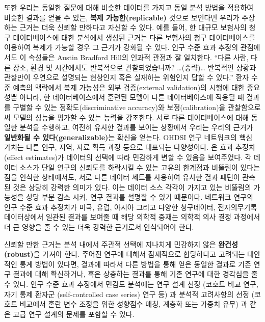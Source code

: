 \documentclass[11pt]{book}
\theoremstyle{definition}
\theoremstyle{definition}
\theoremstyle{definition}
\theoremstyle{remark}
\begin{document}
또한 우리는 동일한 질문에 대해 비슷한 데이터를 가지고 동일 분석 방법을
적용하여 비슷한 결과를 얻을 수 있는, \textbf{복제 가능한(replicable)}
것으로 보인다면 우리가 주장하는 근거는 더욱 신뢰할 만하다고 자신할 수
있다. 예를 들어, 한 대규모 보험사의 청구 데이터베이스에 대한 분석에서
생성된 근거는 다른 보험사의 청구 데이터베이스를 이용하여 복제가 가능할
경우 그 근거가 강화될 수 있다. 인구 수준 효과 추정의 관점에서도 이
속성들은 Austin Bradford Hill의 인과적 관점과 잘 일치한다. ``다른 사람,
다른 장소, 환경 및 시간에서도 반복적으로 관찰되었습니까?
\ldots{}(중략)\ldots{} 반복적인 상황과 관찰만이 우연으로 설명되는
현상인지 혹은 실재하는 위험인지 답할 수 있다.'' \citep{hill_1965} 환자
수준 예측의 맥락에서 복제 가능성은 외부 검증(external validation)의
시행에 대한 중요성뿐 아니라, 한 데이터베이스에서 훈련된 모델이 다른
데이터베이스에 적용될 때 결과를 구별할 수 있는 정확도(discriminative
accuracy)와 보정(calibration)을 관찰함으로써 모델의 성능을 평가할 수
있는 능력을 강조한다. 서로 다른 데이터베이스에 대해 동일한 분석을
수행하고, 여전히 유사한 결과를 보이는 상황에서 우리는 우리의 근거가
\textbf{일반화될 수 있다(generalizable)}는 확신을 얻는다. OHDSI 연구
네트워크의 핵심 가치는 다른 인구, 지역, 자료 획득 과정 등으로 대표되는
다양성이다. \citet{madigan_2013} 은 효과 추정치(effect estimates)가
데이터의 선택에 따라 민감하게 변할 수 있음을 보여주었다. 각 데이터
소스가 단일 연구의 신뢰도를 하락시킬 수 있는 고유의 한계점과 비뚤림이
있다는 점을 인식한 상태에서도, 서로 다른 데이터 세트를 사용하여 유사한
결과 패턴이 관측된 것은 상당히 강력한 의미가 있다. 이는 데이터 소스
각각이 가지고 있는 비뚤림의 가능성을 상당 부분 감소 시켜, 연구 결과를
설명할 수 있기 때문이다. 네트워크 연구의 인구 수준 효과 추정치가 미국,
유럽, 아시아 그리고 다양한 청구데이터, 전자의무기록 데이터상에서 일관된
결과를 보여줄 때 해당 의학적 중재는 의학적 의사 결정 과정에서 더 큰
영향을 줄 수 있는 더욱 강력한 근거로서 인식되어야 한다.

신뢰할 만한 근거는 분석 내에서 주관적 선택에 지나치게 민감하지 않은
\textbf{완건성(robust)}을 가져야 한다. 주어진 연구에 대해서 잠재적으로
합당하다고 고려되는 대안적인 통계 방법이 있다면, 결과에 따라서 다른
방법을 통해 얻은 동일한 결과로 기존 연구 결과에 대해 확신하거나, 혹은
상충하는 결과를 통해 기존 연구에 대한 경각심을 줄 수 있다.
\citep{madigan2013design} 인구 수준 효과 추정에서 민감도 분석에는 연구
설계 선정 (코호트 비교 연구, 자기 통제 환자군 (self-controlled case
series) 연구 등) 과 분석적 고려사항의 선정 (코호트 비교에서 혼란 변수
조정을 위한 성향점수 매칭, 계층화 또는 가중치 유무) 과 같은 고급 연구
설계의 문제를 포함할 수 있다.
\end{document}
